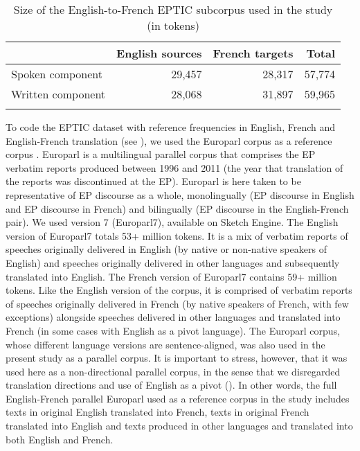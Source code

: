 \documentclass[output=paper]{langscibook}
\begin{document}
\begin{table}
\begin{tabular}{lrrr} 
\lsptoprule
& {English sources} & {French targets} & {Total}\\
\midrule
Spoken component & 29,457 & 28,317 & 57,774\\
Written component & 28,068 & 31,897 & 59,965\\
\lspbottomrule
\end{tabular}
\caption{Size of the English-to-French EPTIC subcorpus used in the study (in tokens)}
\label{tab:lefer:1}
\end{table}

To code the EPTIC dataset with reference frequencies in English, French and English-French translation (see ), we used the Europarl corpus as a reference corpus \citep{Koehn2005}. Europarl is a multilingual parallel corpus that comprises the EP verbatim reports produced between 1996 and 2011 (the year that translation of the reports was discontinued at the EP). Europarl is here taken to be representative of EP discourse as a whole, monolingually (EP discourse in English and EP discourse in French) and bilingually (EP discourse in the English-French pair). We used version 7 (Europarl7), available on Sketch Engine. The English version of Europarl7 totals 53+ million tokens. It is a mix of verbatim reports of speeches originally delivered in English (by native or non-native speakers of English) and speeches originally delivered in other languages and subsequently translated into English. The French version of Europarl7 contains 59+ million tokens. Like the English version of the corpus, it is comprised of verbatim reports of speeches originally delivered in French (by native speakers of French, with few exceptions) alongside speeches delivered in other languages and translated into French (in some cases with English as a pivot language). The Europarl corpus, whose different language versions are sentence-aligned, was also used in the present study as a parallel corpus. It is important to stress, however, that it was used here as a non-directional parallel corpus, in the sense that we disregarded translation directions and use of English as a pivot (\citealt[cf.][259]{Lefer2020}). In other words, the full English-French parallel Europarl used as a reference corpus in the study includes texts in original English translated into French, texts in original French translated into English and texts produced in other languages and translated into both English and French.
\end{document}
